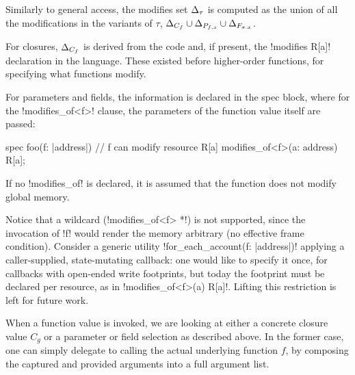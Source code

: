 Similarly to general access, the modifies set $\Delta_\tau$ is computed as the union of all the modifications in the variants of $\tau$, $\Delta_{C_f} \cup \Delta_{P_{f,x}} \cup \Delta_{F_{\sigma.x}}$.

For closures, $\Delta_{C_f}$ is derived from the code and, if present, the !modifies R[a]! declaration in the language.
These existed before higher-order functions, for specifying what functions modify.

For parameters and fields, the information is declared in the spec block, where for the !modifies_of<f>! clause, the parameters of the function value itself are passed:

\begin{MoveBox}
  spec foo(f: |address|) {
    // f can modify resource R[a]
    modifies_of<f>(a: address) R[a];
  }
\end{MoveBox}

\noindent If no !modifies_of! is declared, it is assumed that the function does not modify global memory.

Notice that a wildcard (!modifies_of<f> *!) is not supported, since the invocation of !f! would render the memory arbitrary (no effective frame condition).
Consider a generic utility !for_each_account(f: |address|)! applying a caller-supplied, state-mutating callback: one would like to specify it once, for callbacks with open-ended write footprints, but today the footprint must be declared per resource, as in !modifies_of<f>(a) R[a]!.
Lifting this restriction is left for future work.

\label{sec:enc-invoke}

When a function value is invoked, we are looking at either a concrete closure value $C_{g}$ or a parameter or field selection as described above.
In the former case, one can simply delegate to calling the actual underlying function $f$, by composing the captured and provided arguments into a full argument list.

